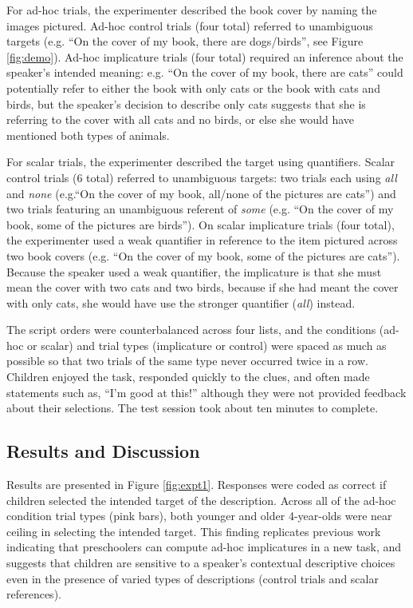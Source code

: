 \documentclass[10pt,letterpaper]{article}
\begin{document}
For ad-hoc trials, the experimenter described the book cover by naming the images pictured. Ad-hoc control trials (four total) referred to unambiguous targets (e.g. ``On the cover of my book, there are dogs/birds'', see Figure \ref{fig:demo}).  Ad-hoc implicature trials (four total) required an inference about the speaker's intended meaning: e.g. ``On the cover of my book, there are cats'' could potentially refer to either the book with only cats or the book with cats and birds, but the speaker's decision to describe only cats suggests that she is referring to the cover with all cats and no birds, or else she would have mentioned both types of animals. 

For scalar trials, the experimenter described the target using quantifiers. Scalar control trials (6 total) referred to unambiguous targets: two trials each using \emph{all} and \emph{none} (e.g.``On the cover of my book, all/none of the pictures are cats'') and two trials featuring an unambiguous referent of \emph{some} (e.g. ``On the cover of my book, some of the pictures are birds'').  On scalar implicature trials (four total), the experimenter used a weak quantifier in reference to the item pictured across two book covers (e.g. ``On the cover of my book, some of the pictures are cats''). Because the speaker used a weak quantifier, the implicature is that she must mean the cover with two cats and two birds, because if she had meant the cover with only cats, she would have use the stronger quantifier (\emph{all}) instead. 

The script orders were counterbalanced across four lists, and the conditions (ad-hoc or scalar) and trial types (implicature or control) were spaced as much as possible so that two trials of the same type never occurred twice in a row. Children enjoyed the task, responded quickly to the clues, and often made statements such as, ``I'm good at this!'' although they were not provided feedback about their selections. The test session took about ten minutes to complete.

\subsection{Results and Discussion}


Results are presented in Figure \ref{fig:expt1}. Responses were coded as correct if children selected the intended target of the description. Across all of the ad-hoc condition trial types (pink bars), both younger and older 4-year-olds were near ceiling in selecting the intended target. This finding replicates previous work indicating that preschoolers can compute ad-hoc implicatures \citep{stiller2014} in a new task, and suggests that children are sensitive to a speaker's contextual descriptive choices even in the presence of varied types of descriptions (control trials and scalar references). 
\end{document}
